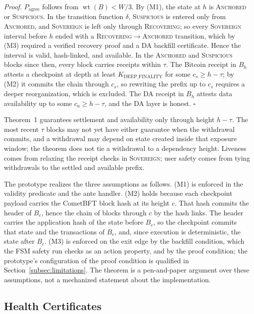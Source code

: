 \emph{Proof.} $P_{\text{agree}}$ follows from $\operatorname{wt}(B) < W/3$. By (M1), the state
at $h$ is \textsc{Anchored} or \textsc{Suspicious}. In the transition
function $\delta$, \textsc{Suspicious} is entered only from
\textsc{Anchored}, and \textsc{Sovereign} is left only through
\textsc{Recovering}; so every \textsc{Sovereign} interval before $h$ ended
with a \textsc{Recovering}$\to$\textsc{Anchored} transition, which by (M3)
required a verified recovery proof and a DA backfill certificate. Hence the
interval is valid, hash-linked, and available. In the \textsc{Anchored} and
\textsc{Suspicious} blocks since then, every block carries receipts within
$\tau$. The Bitcoin receipt in $B_h$ attests a checkpoint at depth at least
$K_{\text{DEEP\_FINALITY}}$ for some $c_s \geq h - \tau$; by (M2) it
commits the chain through $c_s$, so rewriting the prefix up to $c_s$
requires a deeper reorganization, which is excluded. The DA receipt in $B_h$
attests data availability up to some $c_a \geq h - \tau$, and the DA layer
is honest. $\square$

Theorem~1 guarantees settlement and availability only through height
$h - \tau$. The most recent $\tau$ blocks may not yet have either guarantee
when the withdrawal commits, and a withdrawal may depend on state created
inside that exposure window; the theorem does not tie a withdrawal to a
dependency height. Liveness comes from relaxing the receipt checks in
\textsc{Sovereign}; user safety comes from tying withdrawals to the settled
and available prefix.

The prototype realizes the three assumptions as follows. (M1) is enforced in
the validity predicate and the ante handler. (M2) holds because each
checkpoint payload carries the CometBFT block hash at its height
$c$. That hash commits the header of $B_c$, hence the chain of blocks
through $c$ by the hash links. The header carries the application hash of the
state before $B_c$, so the checkpoint commits that state and the transactions of
$B_c$, and, since execution is deterministic, the state after $B_c$. (M3) is enforced on the exit edge by the
backfill condition, which the FSM safety run checks as an action property,
and by the proof condition; the prototype's configuration of the proof
condition is qualified in Section~\ref{subsec:limitations}. The theorem is a
pen-and-paper argument over these assumptions, not a mechanized statement
about the implementation.

\subsection{Health Certificates}
\label{subsec:health-certificate}

